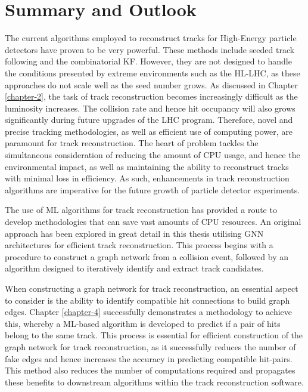 

\chapter{Summary and Outlook}
\label{chapter-8}


The current algorithms employed to reconstruct tracks for High-Energy particle detectors have proven to be very powerful. These methods include seeded track following and the combinatorial KF. However, they are not designed to handle the conditions presented by extreme environments such as the HL-LHC, as these approaches do not scale well as the seed number grows. As discussed in Chapter \ref{chapter-2}, the task of track reconstruction becomes increasingly difficult as the luminosity increases. The collision rate and hence hit occupancy will also grows significantly during future upgrades of the LHC program. Therefore, novel and precise tracking methodologies, as well as efficient use of computing power, are paramount for track reconstruction. The heart of problem tackles the simultaneous consideration of reducing the amount of CPU usage, and hence the environmental impact, as well as maintaining the ability to reconstruct tracks with minimal loss in efficiency. As such, enhancements in track reconstruction algorithms are imperative for the future growth of particle detector experiments. 

The use of ML algorithms for track reconstruction has provided a route to develop methodologies that can save vast amounts of CPU resources. An original approach has been explored in great detail in this thesis utilising GNN architectures for efficient track reconstruction. This process begins with a procedure to construct a graph network from a collision event, followed by an algorithm designed to iteratively identify and extract track candidates. 



When constructing a graph network for track reconstruction, an essential aspect to consider is the ability to identify compatible hit connections to build graph edges. Chapter \ref{chapter-4} successfully demonstrates a methodology to achieve this, whereby a ML-based algorithm is developed to predict if a pair of hits belong to the same track. This process is essential for efficient construction of the graph network for track reconstruction, as it successfully reduces the number of fake edges and hence increases the accuracy in predicting compatible hit-pairs. This method also reduces the number of computations required and propagates these benefits to downstream algorithms within the track reconstruction software.


